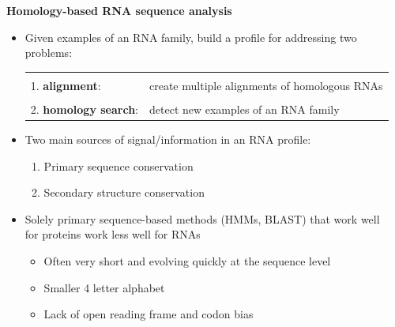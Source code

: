 \documentclass[landscape]{slides}
\begin{document}
\begin{slide}
\begin{center}
\textbf{Homology-based RNA sequence analysis}
\end{center}
\medskip

\small
\begin{itemize}
  \item Given examples of an RNA family, build a profile for addressing two problems:

  \begin{tabular}{ll}
    & \\
    1. \textbf{alignment}: & create multiple alignments of homologous RNAs \\
    & \\
    2. \textbf{homology search}: &  detect new examples of an RNA family
    \\
  \end{tabular}

\item
  Two main sources of signal/information in an RNA profile:
  \begin{enumerate}
  \item
    Primary sequence conservation
  \item
    Secondary structure conservation
  \end{enumerate}
\item
  Solely primary sequence-based methods (HMMs, BLAST) that work well
  \\ for proteins work less well for RNAs
  \begin{itemize}
  \item
    Often very short and evolving quickly at the sequence level
  \item
    Smaller 4 letter alphabet 
  \item
    Lack of open reading frame and codon bias
  \end{itemize}
\end{itemize}
\vfill
\end{slide}
\end{document}
